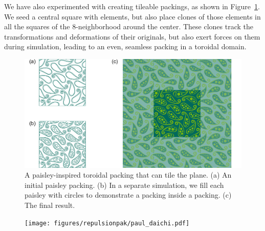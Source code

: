 We have also experimented with creating tileable packings, as shown
in Figure~\ref{paisley_packing}.  We seed a central square with elements,
but also place clones of those elements in all the squares of the
8-neighborhood around the center.  These clones track the transformations
and deformations of their originals, but also exert forces on them during
simulation, leading to an even, seamless packing in a toroidal domain.

\begin{figure}
\centering
\includegraphics[width=1.0\textwidth]{figures/repulsionpak/paisley_new.pdf} 
\vspace{-10pt}
\caption[A paisley-inspired toroidal packing]
{\label{paisley_packing}
A paisley-inspired toroidal packing that can tile the plane. 
           (a) An initial paisley packing.
           (b) In a separate simulation, we fill each paisley with circles to demonstrate a packing inside a packing.
           (c) The final result.
}
\end{figure}



\begin{figure}
\centering
\texttt{[image: figures/repulsionpak/paul\_daichi.pdf]} 
\vspace{-10pt}
\caption[Artist-made Packings using RepulsionPak]
{\label{paul_daichi_packings}
}
\end{figure}

